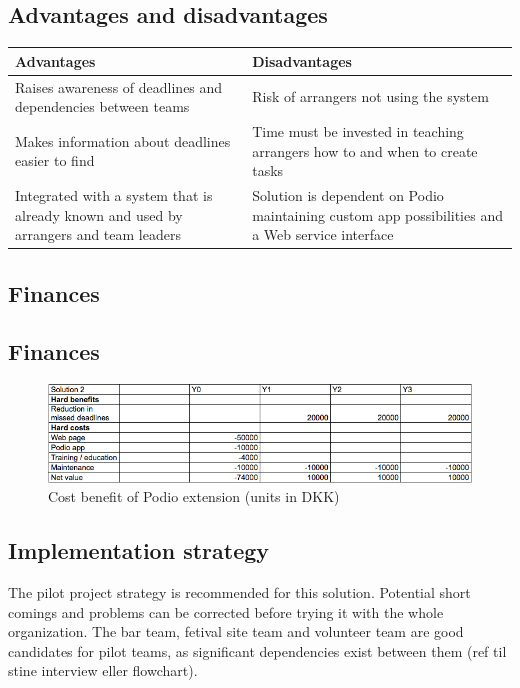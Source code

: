 \subsection{Advantages and disadvantages}
\label{sec:advantages_disadvantages}
\begin{center}
    \begin{tabular}{ | p{7cm} | p{7cm} |}
    \hline
    \textbf{Advantages} & \textbf{Disadvantages}  \\ \hline
     Raises awareness of deadlines and dependencies between teams & Risk of arrangers not using the system\\ \hline
     Makes information about deadlines easier to find & Time must be invested in teaching arrangers how to and when to create tasks\\ \hline
     Integrated with a system that is already known and used by arrangers and team leaders & Solution is dependent on Podio maintaining custom app possibilities and a Web service interface \\ \hline
    \hline
    \end{tabular}
\end{center}


\subsection{Finances}
\subsection{Finances}
\begin{figure}[h!]
  \centering
\includegraphics[scale=0.5]{Pictures/cost-benefit2.png}
    \caption{Cost benefit of Podio extension (units in DKK)}
\end{figure}

\subsection{Implementation strategy}
The pilot project strategy is recommended for this solution. Potential short comings and problems can be corrected before trying it with the whole organization. The bar team, fetival site team and volunteer team are good candidates for pilot teams, as significant dependencies exist between them (ref til stine interview eller flowchart).

